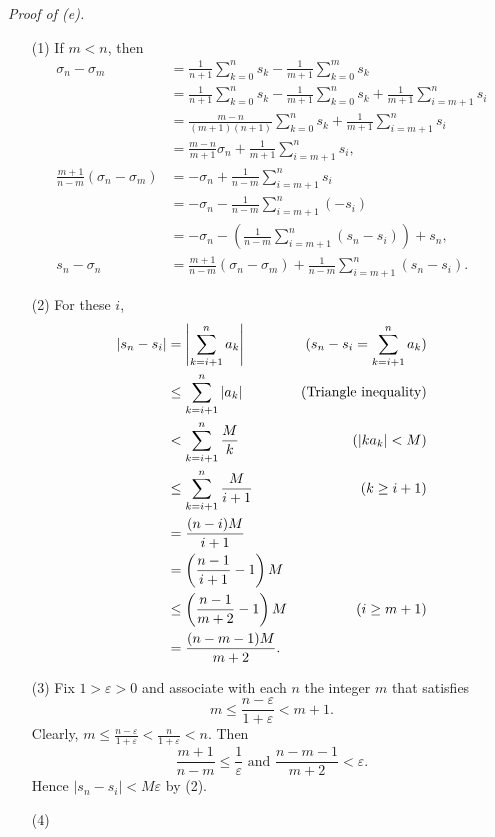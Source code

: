 \documentclass{article}
\begin{document}
\emph{Proof of (e).}
\begin{enumerate}
\item[(1)]
If $m < n$, then
  \begin{align*}
  \sigma_n - \sigma_m
  &= \frac{1}{n+1}\sum_{k=0}^{n}s_{k} - \frac{1}{m+1}\sum_{k=0}^{m}s_{k} \\
  &= \frac{1}{n+1}\sum_{k=0}^{n}s_{k} - \frac{1}{m+1}\sum_{k=0}^{n}s_{k}
    + \frac{1}{m+1}\sum_{i=m+1}^{n}s_i \\
  &= \frac{m-n}{(m+1)(n+1)}\sum_{k=0}^{n}s_{k} + \frac{1}{m+1}\sum_{i=m+1}^{n}s_i \\
  &= \frac{m-n}{m+1}\sigma_n + \frac{1}{m+1}\sum_{i=m+1}^{n}s_i, \\
  \frac{m+1}{n-m}(\sigma_n - \sigma_m)
  &= -\sigma_n + \frac{1}{n-m}\sum_{i=m+1}^{n}s_i \\
  &= -\sigma_n - \frac{1}{n-m}\sum_{i=m+1}^{n}(-s_i) \\
  &= -\sigma_n - \left( \frac{1}{n-m}\sum_{i=m+1}^{n}(s_n - s_i) \right) + s_n, \\
  s_n - \sigma_n
  &= \frac{m+1}{n-m}(\sigma_n - \sigma_m) + \frac{1}{n-m}\sum_{i=m+1}^{n}(s_n - s_i).
  \end{align*}
\item[(2)]
For these $i$,
  \begin{align*}
  |s_n - s_i|
  &= \abs{ \sum_{k=i+1}^{n} a_k }
    &(s_n - s_i = \sum_{k=i+1}^{n} a_k) \\
  &\leq \sum_{k=i+1}^{n} |a_k|
    &\text{(Triangle inequality)} \\
  &< \sum_{k=i+1}^{n} \frac{M}{k}
    &(|ka_k| < M) \\
  &\leq \sum_{k=i+1}^{n} \frac{M}{i+1}
    &(k \geq i+1) \\
  &= \frac{(n-i)M}{i+1} \\
  &= \left( \frac{n-1}{i+1} - 1 \right) M \\
  &\leq \left( \frac{n-1}{m+2} - 1 \right) M
    &(i \geq m+1) \\
  &= \frac{(n-m-1)M}{m+2}.
  \end{align*}
\item[(3)]
Fix $1 > \varepsilon > 0$ and associate with each $n$ the integer $m$ that satisfies
$$m \leq \frac{n-\varepsilon}{1+\varepsilon} < m+1.$$
Clearly, $m \leq \frac{n-\varepsilon}{1+\varepsilon} < \frac{n}{1+\varepsilon} < n$.
Then
$$\frac{m+1}{n-m} \leq \frac{1}{\varepsilon}
\text{ and }
\frac{n-m-1}{m+2} < \varepsilon.$$
Hence $|s_n - s_i| < M\varepsilon$ by (2).
\item[(4)]

\end{enumerate}
\end{document}
